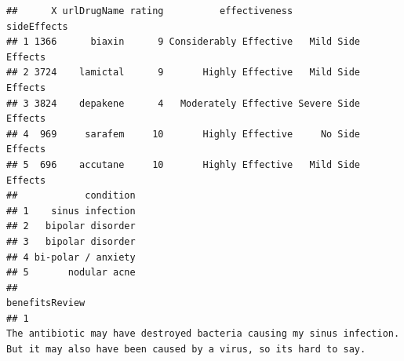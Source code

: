 \documentclass[spanish,]{article}
\begin{document}
\begin{verbatim}
##      X urlDrugName rating          effectiveness         sideEffects
## 1 1366      biaxin      9 Considerably Effective   Mild Side Effects
## 2 3724    lamictal      9       Highly Effective   Mild Side Effects
## 3 3824    depakene      4   Moderately Effective Severe Side Effects
## 4  969     sarafem     10       Highly Effective     No Side Effects
## 5  696    accutane     10       Highly Effective   Mild Side Effects
##            condition
## 1    sinus infection
## 2   bipolar disorder
## 3   bipolar disorder
## 4 bi-polar / anxiety
## 5       nodular acne
##                                                                                                                                                                                                                                                                                                                                                                                                                                                                                                                                                                                                                                                                                                                                                                                                                                                                                                                                        benefitsReview
## 1                                                                                                                                                                                                                                                                                                                                                                                                                                                                                                                                                                                                                                                                                                                                                                                                            The antibiotic may have destroyed bacteria causing my sinus infection.  But it may also have been caused by a virus, so its hard to say.

\end{verbatim}
\end{document}

